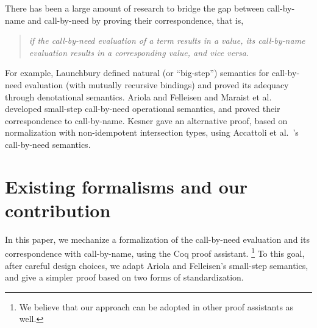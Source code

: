 \documentclass[english]{sumiilab-paper}
\begin{document}
There has been a large amount of research to bridge the gap between call-by-name and call-by-need by proving their correspondence, that is,
\begin{quote}
\emph{if the call-by-need evaluation of a term results in a value, its call-by-name evaluation results in a corresponding value, and vice versa.}
\end{quote}
For example, Launchbury \cite{Launchbury93} defined natural (or ``big-step'') semantics for call-by-need evaluation (with mutually recursive bindings) and proved its adequacy through denotational semantics.
Ariola and Felleisen \cite{Ariola97} and Maraist et al.~\cite{Maraist98} developed small-step call-by-need operational semantics, and proved their correspondence to call-by-name.
Kesner \cite{Kesner16} gave an alternative proof, based on normalization with non-idempotent intersection types, using Accattoli et al.~\cite{Accattoli14}'s call-by-need semantics.

\section{Existing formalisms and our contribution}
In this paper, we mechanize a formalization of the call-by-need evaluation and its correspondence with call-by-name, using the Coq proof assistant.%
\footnote{We believe that our approach can be adopted in other proof assistants as well.}
To this goal, after careful design choices, we adapt Ariola and Felleisen's small-step semantics, and give a simpler proof based on two forms of standardization.
\end{document}
